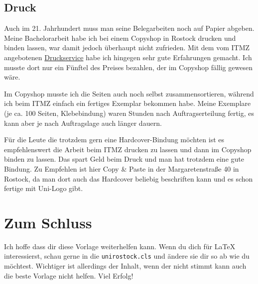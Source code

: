 \subsection{Druck}
Auch im 21. Jahrhundert muss man seine Belegarbeiten noch auf Papier abgeben. Meine Bachelorarbeit habe ich bei einem Copyshop in Rostock drucken und binden lassen, war damit jedoch überhaupt nicht zufrieden. Mit dem vom ITMZ angebotenen \href{https://www.itmz.uni-rostock.de/anwendungen/multimedia/druckservice/angebote-universitaetsmitglieder/druck-von-wissenschaftlichen-arbeiten/}{Druckservice} habe ich hingegen sehr gute Erfahrungen gemacht. Ich musste dort nur ein Fünftel des Preises bezahlen, der im Copyshop fällig gewesen wäre.

Im Copyshop musste ich die Seiten auch noch selbst zusammensortieren, während ich beim ITMZ einfach ein fertiges Exemplar bekommen habe. Meine Exemplare (je ca. 100 Seiten, Klebebindung) waren Stunden nach Auftragserteilung fertig, es kann aber je nach Auftragslage auch länger dauern.

Für die Leute die trotzdem gern eine Hardcover-Bindung möchten ist es empfehlenswert die Arbeit beim ITMZ drucken zu lassen und dann im Copyshop binden zu lassen. Das spart Geld beim Druck und man hat trotzdem eine gute Bindung. Zu Empfehlen ist hier Copy \& Paste in der Margaretenstraße 40 in Rostock, da man dort auch das Hardcover beliebig beschriften kann und es schon fertige mit Uni-Logo gibt.

\section{Zum Schluss}
Ich hoffe dass dir diese Vorlage weiterhelfen kann. Wenn du dich für LaTeX interessierst, schau gerne in die \texttt{unirostock.cls} und ändere sie dir so ab wie du möchtest. Wichtiger ist allerdings der Inhalt, wenn der nicht stimmt kann auch die beste Vorlage nicht helfen. Viel Erfolg!